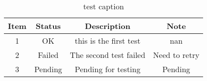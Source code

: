 \begin{table}[h!]
	\centering
	\begin{tabular}{|c c c c|}
		\hline
		Item & Status & Description & Note \\
		\hline
		
		1 & OK & this is the first test & nan \\
		2 & Failed & The second test failed & Need to retry \\
		3 & Pending & Pending for testing & Pending \\
		
		\hline
	\end{tabular}
	\caption{test caption}
	\label{table:test-label}
\end{table}
